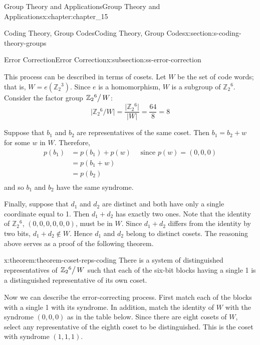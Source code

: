 \documentclass[oneside,10pt,]{book}
\numberwithin{equation}{section}
\begin{document}
\begin{chapterptx}{Group Theory and Applications}{}{Group Theory and Applications}{}{}{x:chapter:chapter_15}
\begin{sectionptx}{Coding Theory, Group Codes}{}{Coding Theory, Group Codes}{}{}{x:section:s-coding-theory-groups}
\begin{subsectionptx}{Error Correction}{}{Error Correction}{}{}{x:subsection:ss-error-correction}
\par
This process can be described in terms of cosets. Let \(W\) be the set of code words; that is, \(W = e\left(\mathbb{Z}_2{}^3 \right)\). Since \(e\) is a homomorphism, \(W\) is a subgroup of \(\mathbb{Z}_2{}^6\). Consider the factor group \(\left.\mathbb{Z}_2{}^6\right/W\):%
\begin{equation*}
\lvert \mathbb{Z}_2{}^6/W \rvert =\frac{\lvert \mathbb{Z}_2{}^6 \rvert }{\lvert W \rvert}=\frac{64}{8}=8
\end{equation*}
%
\par
Suppose that \(b_1\) and \(b_2\) are representatives of the same coset. Then \(b_1= b_2+w\) for some \(w\) in \(W\).  Therefore,%
\begin{equation*}
\begin{split}
p\left(b _1\right) &= p\left(b_1\right) + p(w)\quad \textrm{ since } p(w) = (0, 0, 0)\\
&= p\left(b_1 + w\right)\\
&= p\left(b_2 \right)\\
\end{split}
\end{equation*}
and so \(b_1\) and \(b_2\) have the same syndrome.%
\par
Finally, suppose that \(d_1\) and \(d_2\) are distinct and both have only a single coordinate equal to 1. Then \(d_1+d_2\) has exactly two ones. Note that the identity of \(\mathbb{Z}_2{}^6\),  \((0, 0, 0, 0, 0, 0)\), must be in \(W\). Since \(d_1+d_2\) differs from the identity by two bits, \(d_1+d_2 \notin  W\).   Hence \(d_1\) and \(d_2\) belong to distinct cosets. The reasoning above serves as a proof of the following theorem.%
\begin{theorem}{}{}{x:theorem:theorem-coset-reps-coding}%
There is a system of distinguished representatives of \(\left.\mathbb{Z}_2{}^6\right/W\) such that each of the six-bit blocks having a single 1 is a distinguished representative of its own coset.%
\end{theorem}
Now we can describe the error-correcting process. First match each of the blocks with a single 1 with its syndrome. In addition, match the identity of \(W\) with the syndrome \((0, 0, 0)\) as in the table below. Since there are eight cosets of \(W\), select any representative of the eighth coset to be distinguished. This is the coset with syndrome \((1, 1, 1)\).%
\begin{equation*}
\begin{array}{c|c}
\begin{array}{c}

\end{array}
\end{array}
\end{equation*}
\end{subsectionptx}
\end{sectionptx}
\end{chapterptx}
\end{document}

